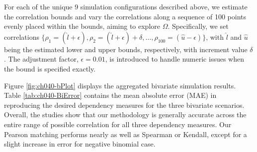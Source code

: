\documentclass[
]{jss}
\begin{document}
For each of the unique 9 simulation configurations described above, we estimate the correlation bounds and vary the correlations along a sequence of 100 points evenly placed within the bounds, aiming to explore \(\Omega\). Specifically, we set correlations \(\{ \rho_1 = ( \hat{l} + \epsilon), \rho_2 = (\hat{l} + \epsilon) + \delta, \ldots, \rho_{100} = (\hat{u} - \epsilon) \}\), with \(\hat{l}\) and \(\hat{u}\) being the estimated lower and upper bounds, respectively, with increment value \(\delta\). The adjustment factor, \(\epsilon=0.01\), is introduced to handle numeric issues when the bound is specified exactly.

Figure \ref{fig:ch040-bPlot} displays the aggregated bivariate simulation results. Table \ref{tab:ch040-BiError} contains the mean absolute error (MAE) in reproducing the desired dependency measures for the three bivariate scenarios. Overall, the studies show that our methodology is generally accurate across the entire range of possible correlation for all three dependency measures. Our Pearson matching performs nearly as well as Spearman or Kendall, except for a slight increase in error for negative binomial case.
\end{document}
